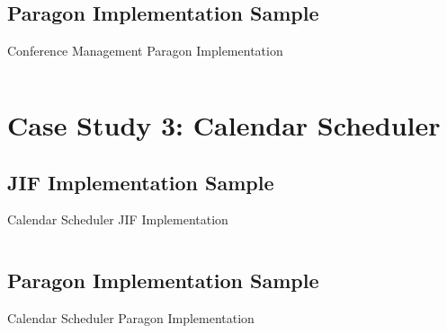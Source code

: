 \inputminted{java}{content/code_sections/case_studies/conf_printout.jif}

\clearpage

\subsection{Paragon Implementation Sample} \label{appendix_conf_para}

\begin{listing}[!ht]
	\caption{Conference Management Paragon Implementation}
	\label{lst_appendix_conf_para}
\end{listing}


\inputminted{java}{content/code_sections/case_studies/conf_printout.para}

\clearpage

\section{Case Study 3: Calendar Scheduler}

\subsection{JIF Implementation Sample} \label{appendix_csched_jif}

\begin{listing}[!ht]
	\caption{Calendar Scheduler JIF Implementation}
	\label{lst_appendix_csched_jif}
\end{listing}

\inputminted{java}{content/code_sections/case_studies/csched_printout.jif}

\clearpage

\subsection{Paragon Implementation Sample} \label{appendix_csched_para}

\begin{listing}[!ht]
	\caption{Calendar Scheduler Paragon Implementation}
	\label{lst_appendix_csched_para}
\end{listing}

\inputminted{java}{content/code_sections/case_studies/csched_printout.para}